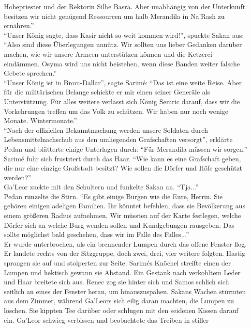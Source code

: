 Hohepriester und der Rektorin Silhe Basra. Aber unabhängig von der Unterkunft besitzen wir nicht 
genügend Ressourcen um halb Merandila in Na'Rash zu ernähren.''\\
``Unser König sagte, dass Kasir nicht so weit kommen wird!'', spuckte Sakan aus: ``Also sind diese 
Überlegungen unnütz. Wir sollten uns lieber Gedanken darüber machen, wie wir unsere Armeen 
unterstützen können und die Ketzerei eindämmen. Osyma wird uns nicht beistehen, wenn diese 
Banden weiter falsche Gebete sprechen.''\\
``Unser König ist in Brom-Dallar'', sagte Sarimé: ``Das ist eine weite Reise. Aber für die 
militärischen Belange schickte er mir einen seiner Generäle als Unterstützung. Für alles weitere 
verlässt sich König Semric darauf, dass wir die Vorkehrungen treffen um das Volk zu schützen. 
Wir haben nur noch wenige Monate. Wintermonate.''\\
``Nach der offiziellen Bekanntmachung werden unsere Soldaten durch Lebensmittelnachschub aus den 
umliegenden Grafschaften versorgt'', erklärte Pedan und blätterte einige Unterlagen durch: ``Für 
Merandila müssen wir sorgen.''\\
Sarimé fuhr sich frustriert durch das Haar. ``Wie kann es eine Grafschaft geben, die nur eine 
einzige Großstadt besitzt? Wie sollen die Dörfer und Höfe geschützt werden?''\\
Ga'Leor zuckte mit den Schultern und funkelte Sakan an. ``Tja...''\\
Pedan runzelte die Stirn. ``Es gibt einige Burgen wie die Eure, Herrin. Sie gehören einigen adeligen Familien. Ihr könntet befehlen, dass sie Bevölkerung aus einem größeren Radius aufnehmen. Wir müssten auf der Karte festlegen, welche Dörfer sich an welche Burg wenden sollen und Kundgebungen rausgeben. Das sollte möglichst bald geschehen, dass wir im Falle des Falles...''\\
Er wurde unterbrochen, als ein brennender Lumpen durch das offene Fenster flog. Er landete rechts 
von der Sitzgruppe, doch zwei, drei, vier weitere folgten. Hastig sprangen sie auf und stolperten 
zur Seite. Sarimés Knöchel streifte einen der Lumpen und hektisch gewann sie Abstand. Ein Gestank 
nach verkohltem Leder und Haar breitete sich aus. Renec zog sie hinter sich und Samos schlich sich seitlich an eines der Fenster heran, um hinauszuspähen. Sakans Wachen stürmten aus dem Zimmer, während 
Ga'Leors sich eilig daran machten, die Lumpen zu löschen. Sie kippten Tee darüber oder schlugen mit 
den seidenen Kissen darauf ein. Ga'Leor schwieg verbissen und beobachtete das Treiben in stiller 

